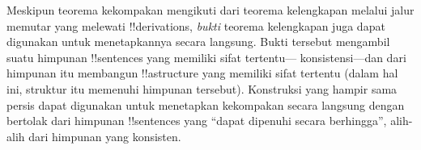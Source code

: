 \documentclass[../../../include/open-logic-section]{subfiles}
\begin{document}
Meskipun teorema kekompakan mengikuti dari teorema kelengkapan melalui
jalur memutar yang melewati !!{derivation}s, \emph{bukti} teorema
kelengkapan juga dapat digunakan untuk menetapkannya secara langsung.
Bukti tersebut mengambil suatu himpunan !!{sentence}s yang memiliki sifat tertentu---
konsistensi---dan dari himpunan itu membangun !!a{structure} yang
memiliki sifat tertentu (dalam hal ini, struktur itu memenuhi himpunan
tersebut). Konstruksi yang hampir sama persis dapat digunakan untuk
menetapkan kekompakan secara langsung dengan bertolak dari himpunan
!!{sentence}s yang ``dapat dipenuhi secara berhingga'', alih-alih dari
himpunan yang konsisten.
\end{document}
